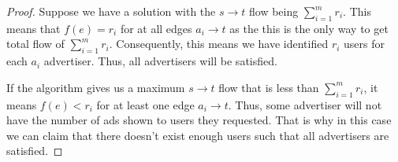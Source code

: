 \documentclass[11pt]{scrartcl}
\begin{document}
\begin{proof}
	Suppose we have a solution with the $s \rightarrow t$ flow being $\sum_{i=1}^m r_i$.
	This means that $f(e) = r_i$ for at all edges $a_i \rightarrow t$ as the this is the only 
	way to get total flow of $\sum_{i=1}^m r_i$. Consequently, this means we have identified 
	$r_i$ users for each $a_i$ advertiser.  Thus, all advertisers will be satisfied. 

	If the algorithm gives us a maximum $s \rightarrow t$ flow that is less than $\sum_{i=1}^m r_i$, 
	it means $f(e) < r_i$ for at least one edge $a_i \rightarrow t$. 
	Thus, some advertiser will not have the number of ads shown to users they requested. 
	That is why in this case we can claim that there doesn't exist enough users such that 
	all advertisers are satisfied.
\end{proof}

































\iffalse
	If all advertisers are satisfied that means $f(e) = r_i$ for each edge $(a_i,t)$.
	To satisfy the conservation condition, let $f^{in}(a_i) = r_i$.
	The capacity condition holds for edges $(a_i,t)$ because we defined the capacity to $r_i$ in our graph.

	To satisfy the conservation condition for the demographic nodes, let these nodes have a flow
	value of $f^{in}(dg_i) = r_i$.
	The capacity condition holds for edges $(dg_i,a_i)$ because we set defined the capacity to $r_i$ in our graph.

	Since we assumed that these exists an assignment of ads to users such that all advertisers are
	satisfied, there must exist at least $r_i$ users for each advertiser $i$ such that they belong in at least one
	demographic group that the advertiser is targeting, i.e. belongs to $X_i$.


	\begin{enumerate}[label=\alph*.]
		\item{
		      \textbf{Capacity Conditions}\\
		      yes
		      }
		\item{
		      \textbf{Conservation Conditions}
		      }
	\end{enumerate}
\fi
\end{document}
